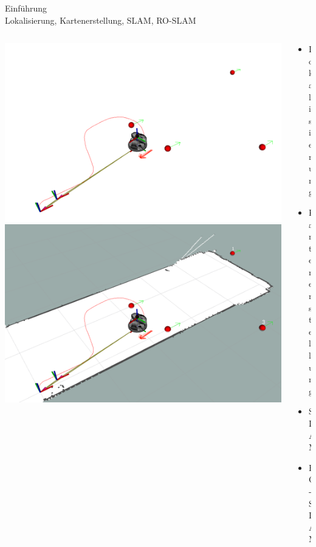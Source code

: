 \documentclass{beamer}
\begin{document}
\begin{frame}{Einführung\\\normalsize{Lokalisierung, Kartenerstellung, SLAM, RO-SLAM}}
\begin{columns}
\begin{column}{0.5\linewidth}
\begin{overlayarea}{\textwidth}{.35\textheight}
{				}
				\only<4>
				{
					\includegraphics[width=\linewidth]{intro_roslam1}
				}
				\only<5>
				{
					\includegraphics[width=\linewidth]{intro_roslam2}
				}
			\end{overlayarea}
		\end{column}
		\begin{column}{0.5\linewidth}
			\begin{itemize}
				\item<1-> Lokalisierung
				\item<2-> Kartenerstellung
				\item<3-> SLAM
				\item<4-> RO-SLAM
			\end{itemize}
		\end{column}
	\end{columns}
\end{frame}
\end{document}
